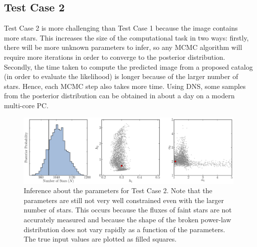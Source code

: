 \documentclass[12pt, preprint]{aastex}
\begin{document}
\subsection{Test Case 2}
Test Case 2 is more challenging than Test Case 1 because the image contains
more stars. This increases the size of the computational task in two ways:
firstly, there will be more unknown parameters to infer, so any MCMC
algorithm will require more iterations in order to converge to the posterior
distribution. Secondly, the time taken
to compute the predicted image from a proposed catalog (in order to evaluate the
likelihood) is longer because of the larger number of stars. Hence, each MCMC
step also takes more time. Using DNS, some
samples from the posterior distribution can be obtained in about a day on a
modern multi-core PC.

\begin{figure}[ht!]
\begin{center}
\includegraphics[width=\textwidth]{Figures/inference2.eps}
\end{center}
\caption{Inference about the parameters for Test Case 2. Note that the
parameters are still not very well constrained even with the larger number of
stars. This occurs because the fluxes of faint stars are not accurately measured
and because the shape of the broken power-law distribution does not vary rapidly
as a function of the parameters. The true input values are plotted as filled squares.\label{fig:results2}}
\end{figure}
\end{document}
